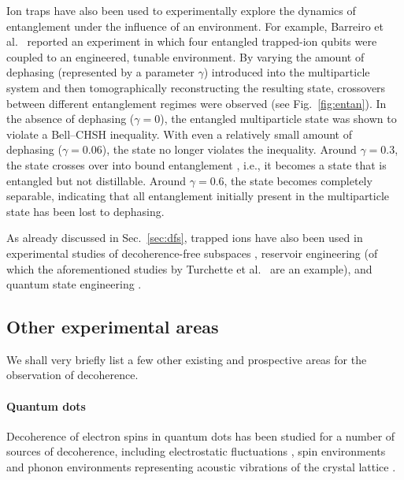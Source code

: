 \documentclass[3p,sort&compress]{elsarticle}
\begin{document}
Ion traps have also been used to experimentally explore the dynamics of entanglement under the influence of an environment. For example, Barreiro et al.\ \cite{Barreiro:2010:aa} reported an experiment in which four entangled trapped-ion qubits were coupled to an engineered, tunable environment. By varying the amount of dephasing (represented by a parameter $\gamma$) introduced into the multiparticle system and then tomographically reconstructing the resulting state, crossovers between different entanglement regimes were observed (see Fig.~\ref{fig:entan}). In the absence of dephasing ($\gamma=0$), the entangled multiparticle state was shown to violate a Bell--CHSH inequality. With even a relatively small amount of dephasing ($\gamma=0.06$), the state no longer violates the inequality. Around $\gamma=0.3$, the state crosses over into bound entanglement \cite{Horodecki:1998:oo}, i.e., it becomes a state that is entangled but not distillable. Around $\gamma=0.6$, the state becomes completely separable, indicating that all entanglement initially present in the multiparticle state has been lost to dephasing. 

As already discussed in Sec.~\ref{sec:dfs}, trapped ions have also been used in experimental studies of decoherence-free subspaces \cite{Kielpinski:2001:uu,Roos:204:pp,Haffner:2005:zz,Langer:2005:uu}, reservoir engineering \cite{Poyatos:1996:um,Myatt:2000:yy,Turchette:2000:aa,Carvalho:2001:ua} (of which the aforementioned studies by Turchette et al.\ \cite{Turchette:2000:aa} are an example), and quantum state engineering \cite{Barreiro:2011:oo,Lin:2013:pp,Kienzler:2015:oo}. 


\subsection{\label{sec:other}Other experimental areas}

We shall very briefly list a few other existing and prospective areas for the observation of decoherence.

\paragraph{Quantum dots} Decoherence of electron spins in quantum dots \cite{Hanson:2007:pp} has been studied for a number of sources of decoherence, including electrostatic fluctuations \cite{Kuhlmann:2013:aa,Arnold:2014:oo}, spin environments \cite{Fischer:2009:ii,Kuhlmann:2013:aa,Urbaszek:2013:pp,Delteil:2014:aa} and phonon environments representing acoustic vibrations of the crystal lattice \cite{Tighineanu:2018:ii}. 
\end{document}
